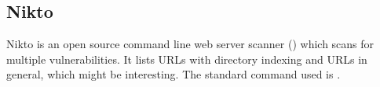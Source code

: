 \subsection{Nikto}
Nikto is an open source command line web server scanner () which scans for multiple vulnerabilities. It lists URLs with directory indexing and URLs in general, which might be interesting. The standard command used is .